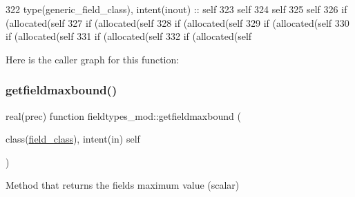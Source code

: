 \begin{DoxyCode}
322     \textcolor{keywordtype}{type}(generic\_field\_class), \textcolor{keywordtype}{intent(inout)} :: self
323     self%
324     self%
325     self%
326     \textcolor{keywordflow}{if} (\textcolor{keyword}{allocated}(self%
327     \textcolor{keywordflow}{if} (\textcolor{keyword}{allocated}(self%
328     \textcolor{keywordflow}{if} (\textcolor{keyword}{allocated}(self%
329     \textcolor{keywordflow}{if} (\textcolor{keyword}{allocated}(self%
330     \textcolor{keywordflow}{if} (\textcolor{keyword}{allocated}(self%
331     \textcolor{keywordflow}{if} (\textcolor{keyword}{allocated}(self%
332     \textcolor{keywordflow}{if} (\textcolor{keyword}{allocated}(self%
\end{DoxyCode}
Here is the caller graph for this function\+:
\mbox{\label{namespacefieldtypes__mod_a1012f73b2800753dd774d0dbff861b6f}} 
\subsubsection{\texorpdfstring{getfieldmaxbound()}{getfieldmaxbound()}}
{\footnotesize\ttfamily real(prec) function fieldtypes\+\_\+mod\+::getfieldmaxbound (\begin{DoxyParamCaption}\item[{class(\mbox{\hyperlink{structfieldtypes__mod_1_1field__class}{field\+\_\+class}}), intent(in)}]{self }\end{DoxyParamCaption})\hspace{0.3cm}{\ttfamily [private]}}



Method that returns the field\textquotesingle{}s maximum value (scalar) 

